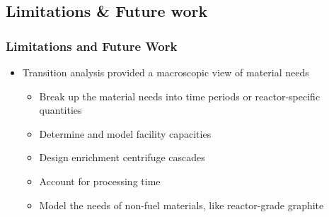 \subsection{Limitations \& Future work}
\begin{frame}
      \frametitle{Limitations and Future Work}
      \begin{itemize}
            \item Transition analysis provided a macroscopic view of 
                  material needs 
            \begin{itemize}
                  \item<2-> Break up the material needs into time periods or 
                  reactor-specific quantities
                  \item<2-> Determine and model facility capacities
                  \item<2-> Design enrichment centrifuge cascades 
                  \item<2-> Account for processing time 
                  \item<2-> Model the needs of non-fuel materials, 
                        like reactor-grade graphite
            \end{itemize}

      \end{itemize} 
\end{frame}